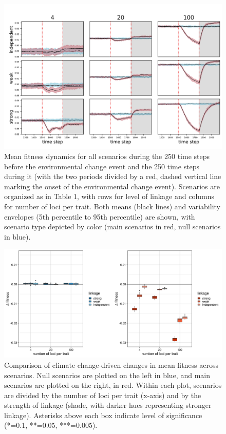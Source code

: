 \documentclass[9pt,twocolumn,twoside,lineno]{pnas-new}
\begin{document}
\begin{figure}
\centering
\includegraphics[width=11.4cm]{fit_over_time.jpg}
\caption{Mean fitness dynamics for all scenarios during the 250 time steps before the environmental change event and the 250 time steps during it (with the two periods divided by a red, dashed vertical line marking the onset of the environmental change event). Scenarios are organized as in Table 1, with rows for level of linkage and columns for number of loci per trait. Both means (black lines) and variability envelopes (5th percentile to 95th percentile) are shown, with scenario type depicted by color (main scenarios in red, null scenarios in blue).}
\label{fig:fit_over_time}
\end{figure}

\begin{figure}
\centering
\includegraphics[width=11.4cm]{fit_boxplot.jpg}
\caption{Comparison of climate change-driven changes in mean fitness across scenarios. Null scenarios are plotted on the left in blue, and main scenarios are plotted on the right, in red. Within each plot, scenarios are divided by the number of loci per trait (x-axis) and by the strength of linkage (shade, with darker hues representing stronger linkage). Asterisks above each box indicate level of significance (*=0.1, **=0.05, ***=0.005).}
\label{fig:fit_boxplot}
\end{figure}
\end{document}
